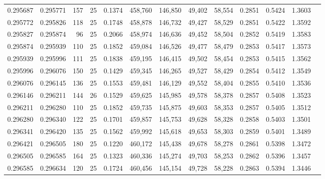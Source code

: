 \begin{tabular}{rrrrrrrrrrrrr}
0.295687 & 0.295771 &   157 &  25 &                                     0.1374 & 458,760 & 146,850 &  49,402 &  58,554 & 0.2851 & 0.5424 & 1.3603 \\
0.295772 & 0.295826 &   118 &  25 &                                     0.1748 & 458,878 & 146,732 &  49,427 &  58,529 & 0.2851 & 0.5422 & 1.3592 \\
0.295827 & 0.295874 &    96 &  25 &                                     0.2066 & 458,974 & 146,636 &  49,452 &  58,504 & 0.2852 & 0.5419 & 1.3583 \\
0.295874 & 0.295939 &   110 &  25 &                                     0.1852 & 459,084 & 146,526 &  49,477 &  58,479 & 0.2853 & 0.5417 & 1.3573 \\
0.295939 & 0.295996 &   111 &  25 &                                     0.1838 & 459,195 & 146,415 &  49,502 &  58,454 & 0.2853 & 0.5415 & 1.3562 \\
0.295996 & 0.296076 &   150 &  25 &                                     0.1429 & 459,345 & 146,265 &  49,527 &  58,429 & 0.2854 & 0.5412 & 1.3549 \\
0.296076 & 0.296145 &   136 &  25 &                                     0.1553 & 459,481 & 146,129 &  49,552 &  58,404 & 0.2855 & 0.5410 & 1.3536 \\
0.296146 & 0.296211 &   144 &  26 &                                     0.1529 & 459,625 & 145,985 &  49,578 &  58,378 & 0.2857 & 0.5408 & 1.3523 \\
0.296211 & 0.296280 &   110 &  25 &                                     0.1852 & 459,735 & 145,875 &  49,603 &  58,353 & 0.2857 & 0.5405 & 1.3512 \\
0.296280 & 0.296340 &   122 &  25 &                                     0.1701 & 459,857 & 145,753 &  49,628 &  58,328 & 0.2858 & 0.5403 & 1.3501 \\
0.296341 & 0.296420 &   135 &  25 &                                     0.1562 & 459,992 & 145,618 &  49,653 &  58,303 & 0.2859 & 0.5401 & 1.3489 \\
0.296421 & 0.296505 &   180 &  25 &                                     0.1220 & 460,172 & 145,438 &  49,678 &  58,278 & 0.2861 & 0.5398 & 1.3472 \\
0.296505 & 0.296585 &   164 &  25 &                                     0.1323 & 460,336 & 145,274 &  49,703 &  58,253 & 0.2862 & 0.5396 & 1.3457 \\
0.296585 & 0.296634 &   120 &  25 &                                     0.1724 & 460,456 & 145,154 &  49,728 &  58,228 & 0.2863 & 0.5394 & 1.3446 \\

\end{tabular}
